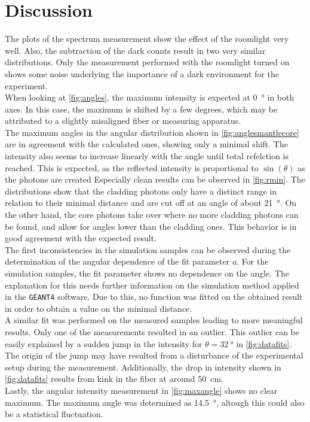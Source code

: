 \section{Discussion}
\label{sec:Discussion}

The plots of the spectrum measurement show the effect of the roomlight very well. Also, the subtraction of the dark counts result in two very similar distributions. Only the measurement performed with the roomlight turned on shows some noise underlying the importance of a dark environment for the experiment.\\
When looking at \autoref{fig:angles}, the maximum intensity is expected at \qty{0}{\degree} in both axes. In this case, the maximum is shifted by a few degrees, which may be attributed to a slightly misaligned fiber or measuring apparatus.\\
The maximum angles in the angular distribution shown in \autoref{fig:anglesmantlecore} are in agreement with the calculated ones, showing only a minimal shift. 
The intensity also seems to increase linearly with the angle until total refelction is reached. This is expected, as the reflected intensity is proportional to $\sin(\theta)$ as the photons are created  %
Especially clean results can be observed in \autoref{fig:rmin}. The distributions show that the cladding photons only have a distinct range in relation to their minimal distance and are cut off at an angle of about \qty{21}{\degree}. On the other hand, the core photons take over where no more cladding photons can be found, and allow for angles lower than the cladding ones. This behavior is in good agreement with the expected result.\\
The first inconsistencies in the simulation samples can be observed during the determination of the angular dependence of the fit parameter $a$. For the simulation samples, the fit parameter shows no dependence on the angle. The explanation for this needs further information on the simulation method applied in the \texttt{GEANT4} software. Due to this, no function was fitted on the obtained result in order to obtain a value on the minimal distance.\\
A similar fit was performed on the measured samples leading to more meaningful results. Only one of the measurements resulted in an outlier. 
This outlier can be easily explained by a sudden jump in the intensity for $\theta=\qty{32}{\degree}$ in \autoref{fig:datafits}. 
The origin of the jump may have resulted from a disturbance of the experimental setup during the measurement. 
Additionally, the drop in intensity shown in \autoref{fig:datafits} results from kink in the fiber at around \qty{50}{\centi\meter}.\\
Lastly, the angular intensity measurement in \autoref{fig:maxangle} shows no clear maximum. The maximum angle was determined as \qty{14.5}{\degree}, altough this could also be a statistical fluctuation.
